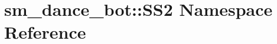 \hypertarget{namespacesm__dance__bot_1_1SS2}{}\section{sm\+\_\+dance\+\_\+bot\+:\+:S\+S2 Namespace Reference}
\label{namespacesm__dance__bot_1_1SS2}
